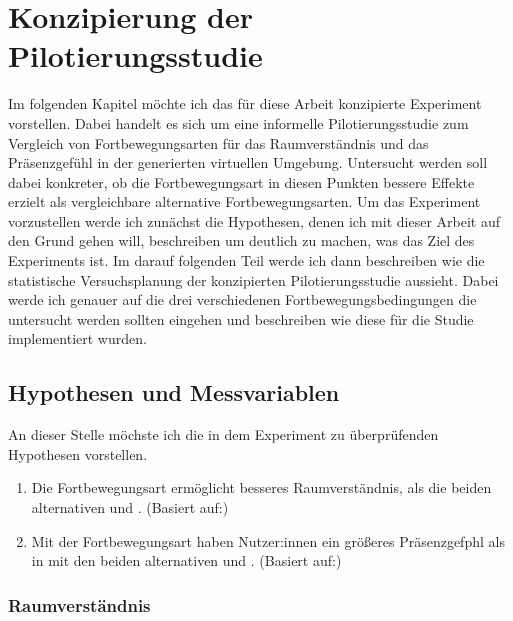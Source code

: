 

\chapter{Konzipierung der Pilotierungsstudie}\label{chapter:experiment}

    Im folgenden Kapitel möchte ich das für diese Arbeit konzipierte Experiment vorstellen. Dabei handelt es sich um eine informelle Pilotierungsstudie zum Vergleich von Fortbewegungsarten für das Raumverständnis und das Präsenzgefühl in der generierten virtuellen Umgebung. Untersucht werden soll dabei konkreter, ob die Fortbewegungsart  in diesen Punkten bessere Effekte erzielt als vergleichbare alternative Fortbewegungsarten.
    Um das Experiment vorzustellen werde ich zunächst die Hypothesen, denen ich mit dieser Arbeit auf den Grund gehen will, beschreiben um deutlich zu machen, was das Ziel des Experiments ist.
    Im darauf folgenden Teil werde ich dann beschreiben wie die statistische Versuchsplanung der konzipierten Pilotierungsstudie aussieht. Dabei werde ich genauer auf die drei verschiedenen Fortbewegungsbedingungen die untersucht werden sollten eingehen und beschreiben wie diese für die Studie implementiert wurden.

    \section{Hypothesen und Messvariablen}
        An dieser Stelle möchste ich die in dem Experiment zu überprüfenden Hypothesen vorstellen.

        \begin{enumerate}
            \item Die  Fortbewegungsart ermöglicht besseres Raumverständnis, als die beiden alternativen  und . (Basiert auf:) %
            \item Mit der  Fortbewegungsart haben Nutzer:innen ein größeres Präsenzgefphl als in mit den beiden alternativen  und . (Basiert auf:) %
        \end{enumerate}

        \subsection{Raumverständnis}

